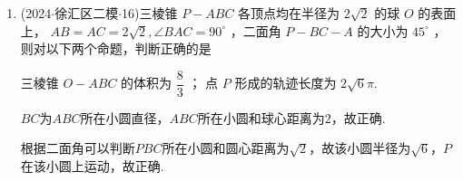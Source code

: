 \begin{enumerate}
\begin{jieda}
        对于  ,假设 ${AB} =  {BC} = {AD} = {CD} = {BD} = 1$ ,取 ${AC} =  \sqrt{2},\left\{  {\begin{array}{l} {AB} \bot  {CD} \\  {AB} \bot  {BC} \end{array} \Longrightarrow  {AB} \bot  }\right.$ 平面 ${BCD} \Longrightarrow  {AD} = \sqrt{2}$ ,与假设 ${BD} = 1$ 矛盾,假设不成立，所以  错误；
        
        对于 ，$A{B}^{2} + C{D}^{2} = A{C}^{2} + B{D}^{2} \Longleftrightarrow \left(\vv{AB} + \vv{AC}\right) \cdot \left(\vv{AB} - \vv{AC}\right) = \left(\vv{BD} + \vv{CD}\right) \cdot \left(\vv{BD} - \vv{CD}\right) \Longleftrightarrow \left(\vv{AB} + \vv{AC}\right) \cdot \vv{CB} = \left(\vv{BD} + \vv{CD}\right) \cdot \vv{BC} \Longleftrightarrow \vv{AD} \cdot \vv{CB} = 0$，所以   正确.
    \end{jieda}

    \item (2024$\cdot$徐汇区二模$\cdot$16)三棱锥 $P - {ABC}$ 各顶点均在半径为 $2\sqrt{2}$ 的球 $O$ 的表面上， ${AB} = {AC} =  2\sqrt{2},\angle {BAC} = {90}^{ \circ  }$ ，二面角 $P - {BC} - A$ 的大小为 ${45}^{ \circ  }$ ，则对以下两个命题，判断正确的是 
    
      三棱锥 $O - {ABC}$ 的体积为 $\dfrac{8}{3}$ ；   点 $P$ 形成的轨迹长度为 $2\sqrt{6}\pi$.
    

    \begin{jieda}
        $BC$为$ABC$所在小圆直径，$ABC$所在小圆和球心距离为$2$，故正确.

        根据二面角可以判断$PBC$所在小圆和圆心距离为$\sqrt{2}$，故该小圆半径为$\sqrt{6}$，$P$在该小圆上运动，故正确.
    \end{jieda}
\end{enumerate}

